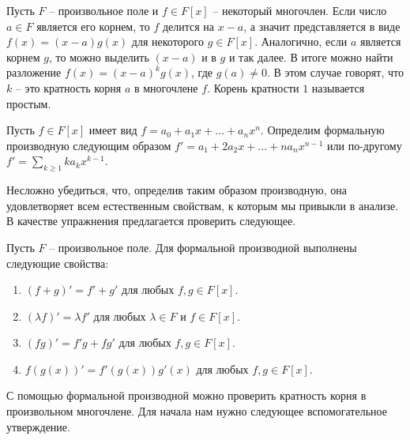 \begin{definition}
 Пусть $F$ -- произвольное поле и $f\in F[x]$ -- некоторый многочлен.
 Если число $a\in F$ является его корнем, то $f$ делится на $x - a$, а значит представляется в виде $f(x) = (x - a) g(x)$ для некоторого $g\in F[x]$.
 Аналогично, если $a$ является корнем $g$, то можно выделить $(x - a)$ и в $g$ и так далее.
 В итоге можно найти разложение $f(x) = (x - a)^k g(x)$, где $g(a) \neq 0$.
 В этом случае говорят, что $k$ -- это кратность корня $a$ в многочлене $f$.
 Корень кратности $1$ называется простым.
\end{definition}


\begin{definition}
Пусть $f\in F[x]$ имеет вид $f = a_0 + a_1 x + \ldots + a_n x^n$.
Определим формальную производную следующим образом $f' = a_1 + 2a_2 x+\ldots + na_n x^{n-1}$ или по-другому $f'=\sum_{k\geqslant 1} k a_k x^{k-1}$.
\end{definition}

Несложно убедиться, что, определив таким образом производную, она удовлетворяет всем естественным свойствам, к которым мы привыкли в анализе.
В качестве упражнения предлагается проверить следующее.

\begin{claim}
Пусть $F$ -- произвольное поле.
Для формальной производной выполнены следующие свойства:
\begin{enumerate}
\item $(f + g)' = f' + g'$ для любых $f,g\in F[x]$.

\item $(\lambda f )' = \lambda f'$ для любых $\lambda\in F$ и $f\in F[x]$.

\item $(fg)' = f' g + fg'$ для любых $f,g\in F[x]$.

\item $f(g(x))' = f'(g(x)) g'(x)$ для любых $f,g\in F[x]$.
\end{enumerate}
\end{claim}


С помощью формальной производной можно проверить кратность корня в произвольном многочлене.
Для начала нам нужно следующее вспомогательное утверждение.

